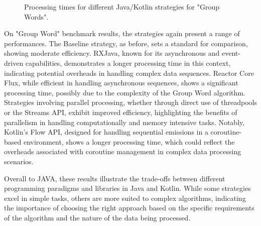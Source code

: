    \begin{figure}[H]
        \centering
        \caption{Processing times for different Java/Kotlin strategies for "Group Words".}
        \label{fig:group_word_processing_times_java}
    \end{figure}
    

    \clearpage
    
    On "Group Word" benchmark results, the strategies again present a range of performances. The Baseline strategy, as before, sets a standard for comparison, showing moderate efficiency. RXJava, known for its asynchronous and event-driven capabilities, demonstrates a longer processing time in this context, indicating potential overheads in handling complex data sequences. Reactor Core Flux, while efficient in handling asynchronous sequences, shows a significant processing time, possibly due to the complexity of the Group Word algorithm. Strategies involving parallel processing, whether through direct use of threadpools or the Streams API, exhibit improved efficiency, highlighting the benefits of parallelism in handling computationally and memory intensive tasks. Notably, Kotlin's Flow API, designed for handling sequential emissions in a coroutine-based environment, shows a longer processing time, which could reflect the overheads associated with coroutine management in complex data processing scenarios.


    Overall to JAVA, these results illustrate the trade-offs between different programming paradigms and libraries in Java and Kotlin. While some strategies excel in simple tasks, others are more suited to complex algorithms, indicating the importance of choosing the right approach based on the specific requirements of the algorithm and the nature of the data being processed.


